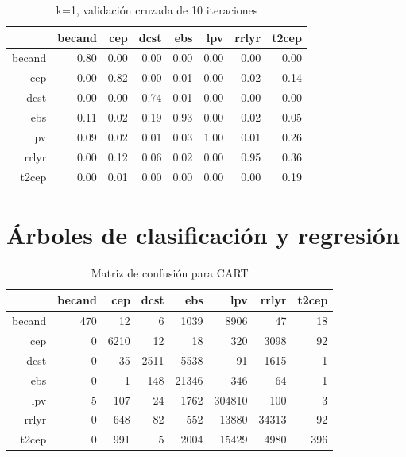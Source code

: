 \documentclass[letterpaper,12pt]{book}
\begin{document}
\begin{table}[ht]
\centering
\caption{k=1, validación cruzada de 10 iteraciones} 
\label{table:cmCvKnn}
\begin{tabular}{rrrrrrrr}
  \hline
 & becand & cep & dcst & ebs & lpv & rrlyr & t2cep \\ 
  \hline
becand & 0.80 & 0.00 & 0.00 & 0.00 & 0.00 & 0.00 & 0.00 \\ 
  cep & 0.00 & 0.82 & 0.00 & 0.01 & 0.00 & 0.02 & 0.14 \\ 
  dcst & 0.00 & 0.00 & 0.74 & 0.01 & 0.00 & 0.00 & 0.00 \\ 
  ebs & 0.11 & 0.02 & 0.19 & 0.93 & 0.00 & 0.02 & 0.05 \\ 
  lpv & 0.09 & 0.02 & 0.01 & 0.03 & 1.00 & 0.01 & 0.26 \\ 
  rrlyr & 0.00 & 0.12 & 0.06 & 0.02 & 0.00 & 0.95 & 0.36 \\ 
  t2cep & 0.00 & 0.01 & 0.00 & 0.00 & 0.00 & 0.00 & 0.19 \\ 
   \hline
\end{tabular}
\end{table}

\section{Árboles de clasificación y regresión}
\begin{table}[ht]
\centering
\caption{Matriz de confusión para CART} 
\label{cuadro:cmCart}
\begin{tabular}{rrrrrrrr}
  \hline
 & becand & cep & dcst & ebs & lpv & rrlyr & t2cep \\ 
  \hline
becand & 470 &  12 &   6 & 1039 & 8906 &  47 &  18 \\ 
  cep &   0 & 6210 &  12 &  18 & 320 & 3098 &  92 \\ 
  dcst &   0 &  35 & 2511 & 5538 &  91 & 1615 &   1 \\ 
  ebs &   0 &   1 & 148 & 21346 & 346 &  64 &   1 \\ 
  lpv &   5 & 107 &  24 & 1762 & 304810 & 100 &   3 \\ 
  rrlyr &   0 & 648 &  82 & 552 & 13880 & 34313 &  92 \\ 
  t2cep &   0 & 991 &   5 & 2004 & 15429 & 4980 & 396 \\ 
   \hline
\end{tabular}
\end{table}
\end{document}
